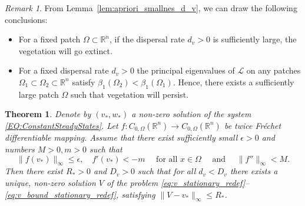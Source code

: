\documentclass[preprint,12pt]{elsarticle}
\theoremstyle{plain}
\newtheorem{thm}{Theorem}[section]
\theoremstyle{definition}
\theoremstyle{remark}
\newtheorem{rem}{Remark}[section]
\begin{document}
\begin{rem}
    \label{rem:dispersal_patch_condition}
    From Lemma~\ref{lem:apriori_smallnes_d_v}, we can draw the following conclusions:
    \begin{itemize}
        \item For a fixed patch $\Omega \subset \mathbb{R}^n$, if the dispersal rate $d_v > 0$ is sufficiently large, the vegetation will go extinct. 
        \item For a fixed dispersal rate $d_v > 0$ the principal eigenvalues of $\mathcal{L}$ on any patches 
        $\Omega_1 \subset \Omega_2 \subset \mathbb{R}^n$ satisfy 
        $\beta_1(\Omega_2) < \beta_1(\Omega_1)$. 
        Hence, there exists a sufficiently large patch $\Omega$ such that vegetation will persist. 
    \end{itemize}
\end{rem}

\begin{thm}
    \label{thm:Stationary-Solutions-Existence}
    Denote by $(v_*, w_*)$ a non-zero solution of the system \eqref{EQ:ConstantSteadyStates}. Let $f : C_{0, \Omega}(\mathbb{R}^n) \rightarrow C_{0, \Omega}(\mathbb{R}^n)$ be twice Fr\'echet differentiable mapping. Assume that there exist sufficiently small $\epsilon > 0$ and numbers $M > 0, m > 0$ such that
    \begin{equation}
        \label{eq:nonlinearity_f_assumptions}
        \|f(v_*)\|_\infty \leq \epsilon, 
        \quad
        f'(v_*) < -m
        \quad
        \text{ for all }
        x \in \Omega
        \quad
        \text{ and }
        \quad
        \|f''\|_\infty < M.
    \end{equation}
    Then there exist $R_* > 0$ and $D_v > 0$ such that for all $d_v < D_v$ there exists a unique, non-zero solution $V$ of the problem \eqref{eq:v_stationary_redef}--\eqref{eq:v_bound_stationary_redef}, satisfying $\|V-v_*\|_\infty \leq R_*$.
\end{thm}
\end{document}
